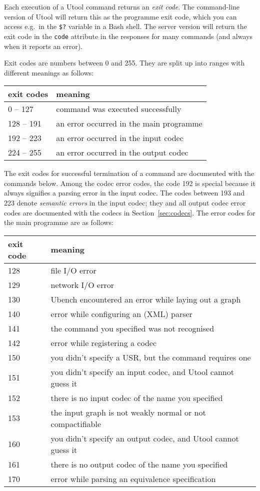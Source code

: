 Each execution of a Utool command returns an \emph{exit code}. The
command-line version of Utool will return this as the programme exit
code, which you can access e.g.\ in the \texttt{\$?} variable in a
Bash shell. The server version will return the exit code in the
\verb?code? attribute in the responses for many commands (and always
when it reports an error).

Exit codes are numbers between 0 and 255. They are split up into
ranges with different meanings as follows:

\begin{tabular}{l|l}
exit codes & meaning \\\hline
0 -- 127 & command was executed successfully \\
128 -- 191 & an error occurred in the main programme \\
192 -- 223 & an error occurred in the input codec \\
224 -- 255 & an error occurred in the output codec
\end{tabular}

The exit codes for successful termination of a command are documented
with the commands below. Among the codec error codes, the code 192 is
special because it always signifies a parsing error in the input
codec. The codes between 193 and 223 denote \emph{semantic errors} in
the input codec; they and all output codec error codes are documented
with the codecs in Section~\ref{sec:codecs}. The error codes for the
main programme are as follows:

\begin{tabular}{l|l}
exit code & meaning \\\hline
128 & file I/O error \\
129 & network I/O error \\
130 & Ubench encountered an error while laying out a graph \\

140 & error while configuring an (XML) parser \\
141 & the command you specified was not recognised \\
142 & error while registering a codec \\

150 & you didn't specify a USR, but the command requires one \\
151 & you didn't specify an input codec, and Utool cannot guess it \\
152 & there is no input codec of the name you specified \\
153 & the input graph is not weakly normal or not compactifiable \\

160 & you didn't specify an output codec, and Utool cannot guess it \\
161 & there is no output codec of the name you specified \\

170 & error while parsing an equivalence specification
\end{tabular}




